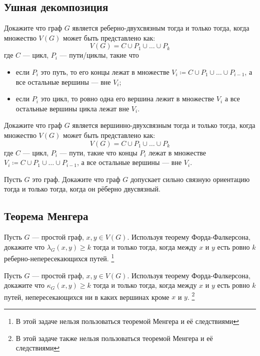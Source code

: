 \documentclass[a4paper,12pt,twoside]{article}
\begin{document}
\subsection*{Ушная декомпозиция}

\begin{?}
    Докажите что граф \(G\) является реберно-двухсвязным тогда и только тогда, когда множество \(V(G)\) может быть представлено как:
    \[
        V(G) = C \cup P_1 \cup \ldots \cup P_k
    \] 
    где \(C\) --- цикл, \(P_i\) --- пути/циклы, такие что
    \begin{itemize}[noitemsep, topsep=0pt,parsep=0pt]
        \item если \(P_i\) это путь, то его концы лежат в множестве \(V_i \coloneqq C \cup P_1 \cup \ldots \cup P_{i-1}\), а все остальные вершины --- вне \(V_i\);
        \item если \(P_i\) это цикл, то ровно одна его вершина лежит в множестве \(V_i\) а все остальные вершины цикла лежат вне \(V_i\).
    \end{itemize}
\end{?}
\begin{?}
    Докажите что граф \(G\) является вершинно-двухсвязным тогда и только тогда, когда множество \(V(G)\) может быть представлено как:
    \[
        V(G) = C \cup P_1 \cup \ldots \cup P_k
    \] 
    где \(C\) --- цикл, \(P_i\) --- пути, такие что концы \(P_i\) лежат в множестве \(V_i \coloneqq C \cup P_1 \cup \ldots \cup P_{i-1}\), а все остальные вершины --- вне \(V_i\).
\end{?}
\begin{?}
    Пусть \(G\) это граф. Докажите что граф \(G\) допускает сильно связную ориентацию тогда и только тогда, когда он рёберно двусвязный.
\end{?}

\subsection*{Теорема Менгера}
\begin{?}
    Пусть \(G\) --- простой граф, \(x, y \in V(G)\). Используя теорему Форда-Фалкерсона, докажите что \(\lambda_G(x, y) \geqslant k\) тогда и только тогда, когда между \(x\) и \(y\) есть ровно \(k\) реберно-непересекающихся путей. \footnote{В этой задаче нельзя пользоваться теоремой Менгера и её следствиями}
\end{?}
\begin{?}
    Пусть \(G\) --- простой граф, \(x, y \in V(G)\). Используя теорему Форда-Фалкерсона, докажите что \(\kappa_G(x, y) \geqslant k\) тогда и только тогда, когда между \(x\) и \(y\) есть ровно \(k\) путей, непересекающихся ни в каких вершинах кроме \(x\) и \(y\). \footnote{В этой задаче также нельзя пользоваться теоремой Менгера и её следствиями}
\end{?}
\end{document}
